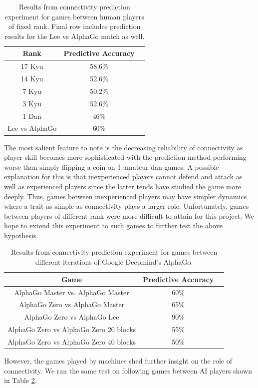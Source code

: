 \documentclass[11pt]{article}
\begin{document}
\begin{table}[ht]
    \centering
  \begin{tabular}{|c | c | c|}
      \hline
      Rank & Predictive Accuracy \\
      \hline
      17 Kyu & 58.6\% \\
      \hline
      14 Kyu & 52.6\% \\
            \hline
      7 Kyu &  50.2\% \\
            \hline
      3 Kyu & 52.6\% \\
            \hline
      1 Dan & 46\% \\
            \hline
      Lee vs AlphaGo & 60\% \\
            \hline

      \end{tabular}
      \caption{Results from connectivity prediction experiment for games between human players of fixed rank. Final row includes prediction results for the Lee vs AlphaGo match as well.}
      \label{tab:exp}
\end{table}

The most salient feature to note is the decreasing reliability of connectivity as player skill becomes more sophisticated with the prediction method performing worse than simply flipping a coin on 1 amateur dan games. A possible explanation for this is that inexperienced players cannot defend and attack as well as experienced players since the latter tends have studied the game more deeply. Thus, games between inexperienced players may have simpler dynamics where a trait as simple as connectivity plays a larger role. Unfortunately, games between players of different rank were more difficult to attain for this project. We hope to extend this experiment to such games to further test the above hypothesis.
\begin{table}[ht]
    \centering
  \begin{tabular}{|c | c | c|}
      \hline
      Game & Predictive Accuracy \\
      \hline
      AlphaGo Master vs. AlphaGo Master & 60\% \\
      \hline
      AlphaGo Zero vs AlphaGo Master & 65\% \\
            \hline
      AlphaGo Zero vs AlphaGo Lee &  90\% \\
            \hline
      AlphaGo Zero vs AlphaGo Zero 20 blocks & 55\% \\
            \hline
      AlphaGo Zero vs AlphaGo Zero 40 blocks & 50\% \\
            \hline
      \end{tabular}
      \caption{Results from connectivity prediction experiment for games between different iterations of Google Deepmind's AlphaGo.}
      \label{tab:mexp}
\end{table}
However, the games played by machines shed further insight on the role of connectivity. We ran the same test on following games between AI players shown in Table \ref{tab:mexp}.
\end{document}

